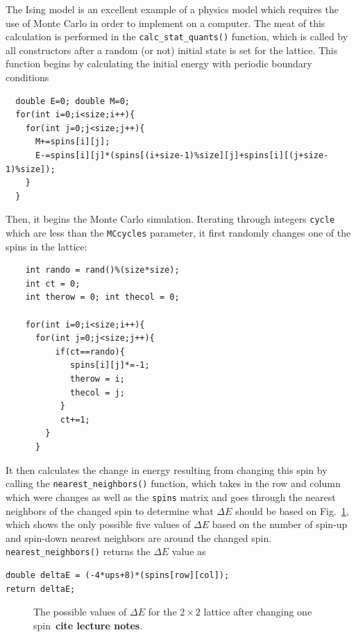 \documentclass[12pt]{article}
\numberwithin{equation}{section}
\begin{document}
\par The Ising model is an excellent example of a physics model which requires the use of Monte Carlo in order to implement on a computer.  The meat of this calculation is performed in the \texttt{calc\_stat\_quants()} function, which is called by all constructors after a random (or not) initial state is set for the lattice.  This function begins by calculating the initial energy with periodic boundary conditions
\begin{verbatim}
  double E=0; double M=0;
  for(int i=0;i<size;i++){
    for(int j=0;j<size;j++){
      M+=spins[i][j];
      E-=spins[i][j]*(spins[(i+size-1)%size][j]+spins[i][(j+size-1)%size]);
    }
  }
\end{verbatim}
Then, it begins the Monte Carlo simulation.  Iterating through integers \texttt{cycle} which are less than the \texttt{MCcycles} parameter, it first randomly changes one of the spins in the lattice:
\begin{verbatim}
    int rando = rand()%(size*size); 
    int ct = 0;
    int therow = 0; int thecol = 0;
    
    for(int i=0;i<size;i++){
      for(int j=0;j<size;j++){
          if(ct==rando){
             spins[i][j]*=-1;
             therow = i;
             thecol = j;
           }
           ct+=1;
        }
      }
\end{verbatim}
It then calculates the change in energy resulting from changing this spin by calling the \texttt{nearest\_neighbors()} function, which    takes in the row and column which were changes as well as the \texttt{spins} matrix and goes through the nearest neighbors of the changed spin to determine what $\Delta E$ should be based on Fig.~\ref{fig:deltaEs}, which shows the only possible five values of $\Delta E$ based on the number of spin-up and spin-down nearest neighbors are around the changed spin.  \texttt{nearest\_neighbors()} returns the $\Delta E$ value as 
\begin{verbatim}
double deltaE = (-4*ups+8)*(spins[row][col]);
return deltaE;
\end{verbatim}

\begin{figure}[ht]
\begin{center}
\caption{The possible values of $\Delta E$ for the $2\times2$ lattice after changing one spin~\textbf{cite lecture notes}.}
\label{fig:deltaEs}
\end{center}
\end{figure}
\end{document}
